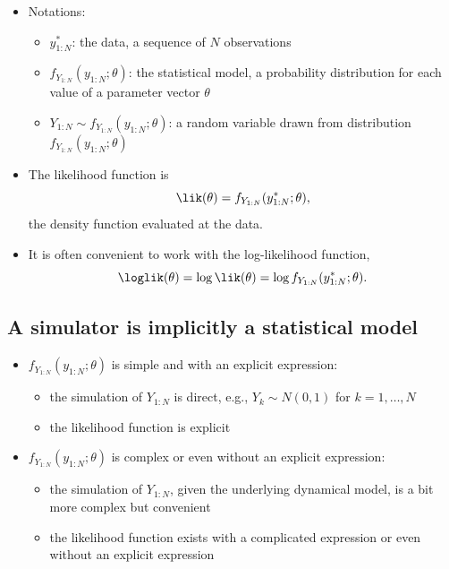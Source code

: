 \documentclass[
  letterpaper,
  DIV=11,
  numbers=noendperiod]{scrartcl}
\providecommand{\tightlist}{%
  \setlength{\itemsep}{0pt}\setlength{\parskip}{0pt}}\usepackage{longtable,booktabs,array}
\begin{document}
\begin{itemize}
\tightlist
\item
  Notations:

  \begin{itemize}
  \tightlist
  \item
    \(y_{1:N}^*\): the data, a sequence of \(N\) observations
  \item
    \(f_{Y_{1:N}}(y_{1:N};\theta)\): the statistical model, a
    probability distribution for each value of a parameter vector
    \(\theta\)
  \item
    \(Y_{1:N} \sim f_{Y_{1:N}}(y_{1:N};\theta)\): a random variable
    drawn from distribution \(f_{Y_{1:N}}(y_{1:N};\theta)\)
  \end{itemize}
\item
  The likelihood function is
  \[\lik(\theta) = f_{Y_{1:N}}(y^*_{1:N};\theta),\] the density function
  evaluated at the data.
\item
  It is often convenient to work with the log-likelihood function,
  \[\loglik(\theta)= \log \lik(\theta) = \log f_{Y_{1:N}}(y^*_{1:N};\theta).\]
\end{itemize}

\hypertarget{a-simulator-is-implicitly-a-statistical-model}{%
\subsection{A simulator is implicitly a statistical
model}\label{a-simulator-is-implicitly-a-statistical-model}}

\begin{itemize}
\tightlist
\item
  \(f_{Y_{1:N}}(y_{1:N};\theta)\) is simple and with an explicit
  expression:

  \begin{itemize}
  \tightlist
  \item
    the simulation of \(Y_{1:N}\) is direct, e.g., \(Y_k \sim N(0,1)\)
    for \(k=1,\dots,N\)
  \item
    the likelihood function is explicit
  \end{itemize}
\item
  \(f_{Y_{1:N}}(y_{1:N};\theta)\) is complex or even without an explicit
  expression:

  \begin{itemize}
  \tightlist
  \item
    the simulation of \(Y_{1:N}\), given the underlying dynamical model,
    is a bit more complex but convenient
  \item
    the likelihood function exists with a complicated expression or even
    without an explicit expression
  \end{itemize}
\end{itemize}
\end{document}
